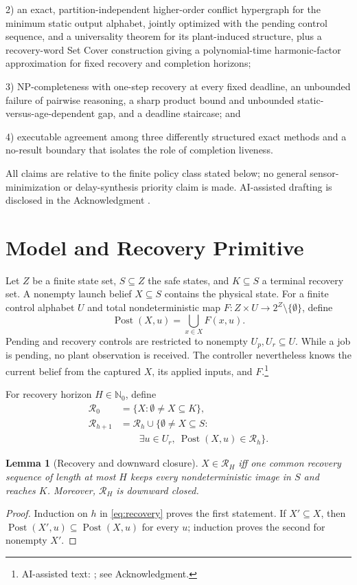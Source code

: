 \documentclass[letterpaper,10pt,conference]{ieeeconf}
\newtheorem{lemma}{Lemma}
\newcommand{\Post}{\operatorname{Post}}
\newcommand{\cR}{\mathcal R}
\begin{document}
2) an exact, partition-independent higher-order conflict hypergraph for the minimum static output
alphabet, jointly optimized with the pending control sequence, and a universality theorem for its
plant-induced structure, plus a recovery-word Set Cover construction giving a polynomial-time
harmonic-factor approximation for fixed recovery and completion horizons;

3) NP-completeness with one-step recovery at every fixed deadline, an unbounded failure of pairwise
reasoning, a sharp product bound and unbounded static-versus-age-dependent gap, and a deadline staircase; and

4) executable agreement among three differently structured exact methods and a no-result boundary that
isolates the role of completion liveness.

All claims are relative to the finite policy class stated below; no general sensor-minimization or
delay-synthesis priority claim is made. AI-assisted drafting is disclosed in the Acknowledgment
\cite{openai2026codex}.

\section{Model and Recovery Primitive}

Let $Z$ be a finite state set, $S\subseteq Z$ the safe states, and $K\subseteq S$ a terminal
recovery set. A nonempty launch belief $X\subseteq S$ contains the physical state. For a finite control
alphabet $U$ and total nondeterministic map $F:Z\times U\to 2^Z\setminus\{\emptyset\}$, define
\begin{equation}
 \Post(X,u)=\bigcup_{x\in X}F(x,u).
\end{equation}
Pending and recovery controls are restricted to nonempty $U_p,U_r\subseteq U$. While a job is
pending, no plant observation is received. The controller nevertheless knows the current belief
from the captured $X$, its applied inputs, and $F$.\footnote{AI-assisted text: \cite{openai2026codex};
see Acknowledgment.}

For recovery horizon $H\in\mathbb N_0$, define
\begin{align}
 \cR_0&=\{X:\emptyset\ne X\subseteq K\},\nonumber\\
 \cR_{h+1}&=\cR_h\cup\{\emptyset\ne X\subseteq S:\nonumber\\
 &\qquad\exists u\in U_r,\ \Post(X,u)\in\cR_h\}. \label{eq:recovery}
\end{align}

\begin{lemma}[Recovery and downward closure]
$X\in\cR_H$ iff one common recovery sequence of length at most $H$ keeps every nondeterministic
image in $S$ and reaches $K$. Moreover, $\cR_H$ is downward closed.
\end{lemma}
\begin{proof}
Induction on $h$ in \eqref{eq:recovery} proves the first statement. If $X'\subseteq X$, then
$\Post(X',u)\subseteq\Post(X,u)$ for every $u$; induction proves the second for nonempty $X'$.
\end{proof}
\end{document}
